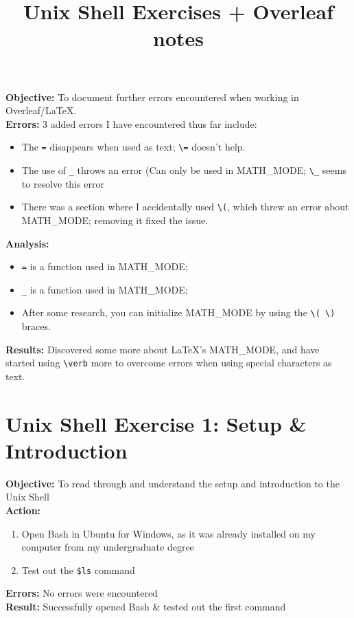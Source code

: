 \documentclass{article}
\begin{document}
\textbf{Objective:} To document further errors encountered when working in Overleaf/LaTeX. \\
\textbf{Errors:} 3 added errors I have encountered thus far include:
\begin{itemize}
    \item The \verb|=| disappears when used as text; \verb|\=| doesn't help.
    \item The use of \verb|_| throws an error (Can only be used in MATH\_MODE; \verb|\_| seems to resolve this error
    \item There was a section where I accidentally used \verb|\(|, which threw an error about MATH\_MODE; removing it fixed the issue.
\end{itemize}
\textbf{Analysis:}
\begin{itemize}
    \item \verb|=| is a function used in MATH\_MODE;
    \item \verb|_| is a function used in MATH\_MODE;
    \item After some research, you can initialize MATH\_MODE by using the \verb|\( \)| braces.
\end{itemize}
\textbf{Results:} Discovered some more about LaTeX's MATH\_MODE, and have \\started using \verb|\verb| more to overcome errors when using special characters as text.
\newpage
\title{Unix Shell Exercises + Overleaf notes}
\maketitle
\newpage
\section{Unix Shell Exercise 1: Setup \& Introduction}
\textbf{Objective:} To read through and understand the setup and introduction to the Unix Shell\\
\textbf{Action:}
\begin{enumerate}
    \item Open Bash in Ubuntu for Windows, as it was already installed on my computer from my undergraduate degree
    \item Test out the \verb|$ls| command
\end{enumerate}
\textbf{Errors:} No errors were encountered\\
\textbf{Result:} Successfully opened Bash \& tested out the first command
\newpage
\end{document}
